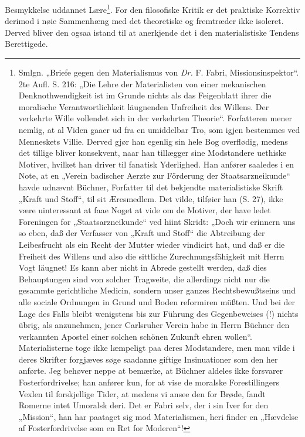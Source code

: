 \documentclass[12pt,a4paper,openany]{book}
\newcommand{\opage}[1]{\marginnote{\footnotesize\textit{[#1]}}}
\begin{document}
Besmykkelse uddannet Lære\footnote{Smlgn. „Briefe gegen den Materialismus von \textit{Dr.} F. Fabri, Missionsinspektor“. 2te Aufl. S. 216: „Die Lehre der Materialisten von einer mekanischen Denknothwendigkeit ist im Grunde nichts als das Feigenblatt ihrer die moralische Verantwortlichkeit läugnenden Unfreiheit des Willens. Der verkehrte Wille vollendet sich in der verkehrten Theorie“. Forfatteren mener nemlig, at al Viden gaaer ud fra en umiddelbar Tro, som igjen bestemmes ved Menneskets Villie. Derved gjør han egenlig sin hele Bog overflødig, medens det tillige bliver konsekvent, naar han tillægger sine Modstandere uethiske Motiver, hvilket han driver til fanatisk Yderlighed. Han anfører saaledes i en Note, at en „Verein badischer Aerzte zur Förderung der Staatsarzneikunde“ havde udnævnt Büchner, Forfatter til det bekjendte materialistiske Skrift „Kraft und Stoff“, til sit Æresmedlem. Det vilde, tilføier han (S. 27), ikke være uinteressant at faae Noget at vide om de Motiver, der have ledet Foreningen for „Staatsarzneikunde“ ved hiint Skridt: „Doch wir erinnern uns so eben, daß der Verfasser von „Kraft und Stoff“ die Abtreibung der Leibesfrucht als ein Recht der Mutter wieder vindicirt hat, und daß er die Freiheit des Willens und also die sittliche Zurechnungsfähigkeit mit Herrn Vogt läugnet! Es kann aber nicht in Abrede gestellt werden, daß dies Behauptungen sind von solcher Tragweite, die allerdings nicht nur die gesammte gerichtliche Medicin, sondern unser ganzes Rechtsbewußtseins und alle sociale Ordnungen in Grund und Boden reformiren müßten. Und bei der Lage des Falls bleibt wenigstens bis zur Führung des Gegenbeweises (!) nichts übrig, als anzunehmen, jener Carlsruher Verein habe in Herrn Büchner den verkannten Apostel einer solchen schönen Zukunft ehren wollen“. Materialisterne toge ikke læmpeligt paa deres Modstandere, men man vilde i deres Skrifter forgjæves søge saadanne giftige Insinuationer som den her anførte. Jeg behøver neppe at bemærke, at Büchner aldeles ikke forsvarer Fosterfordrivelse; han anfører kun, for at vise de moralske Forestillingers Vexlen til forskjellige Tider, at medens vi ansee den for Brøde, fandt Romerne intet Umoralsk deri. Det er Fabri selv, der i sin Iver for den „Mission“, han har paataget sig mod Materialismen, heri finder en „Hævdelse af Fosterfordrivelse som en Ret for Moderen“!}. For den filosofiske Kritik er
\opage{199}det praktiske Korrektiv derimod i nøie Sammenhæng med det
theoretiske og fremtræder ikke isoleret. Derved bliver den
ogsaa istand til at anerkjende det i den materialistiske Tendens
Berettigede.
\end{document}
